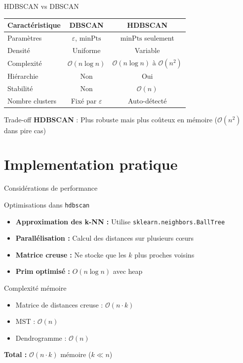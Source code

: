\documentclass[aspectratio=139,8pt]{beamer}
\newcommand{\minPts}{\mathrm{minPts}}
\begin{document}
\begin{frame}{HDBSCAN vs DBSCAN}
\begin{center}
\begin{tabular}{|l|c|c|}
\hline
\textbf{Caractéristique} & \textbf{DBSCAN} & \textbf{HDBSCAN} \\
\hline
Paramètres & $\varepsilon$, $\minPts$ & $\minPts$ seulement \\
\hline
Densité & Uniforme & Variable \\
\hline
Complexité & $\mathcal{O}(n \log n)$ & $\mathcal{O}(n \log n)$ à $\mathcal{O}(n^2)$ \\
\hline
Hiérarchie & Non & Oui \\
\hline
Stabilité & Non & $\mathcal{O}(n)$ \\
\hline
Nombre clusters & Fixé par $\varepsilon$ & Auto-détecté \\
\hline
\end{tabular}
\end{center}

\begin{block}{Trade-off}
\textbf{HDBSCAN} : Plus robuste mais plus coûteux en mémoire ($\mathcal{O}(n^2)$ dans pire cas)
\end{block}
\end{frame}

\section{Implementation pratique}

\begin{frame}{Considérations de performance}
\begin{block}{Optimisations dans \texttt{hdbscan}}
\begin{itemize}
\item \textbf{Approximation des k-NN :} Utilise \texttt{sklearn.neighbors.BallTree}
\item \textbf{Parallélisation :} Calcul des distances sur plusieurs cœurs
\item \textbf{Matrice creuse :} Ne stocke que les $k$ plus proches voisins
\item \textbf{Prim optimisé :} $O(n \log n)$ avec heap
\end{itemize}
\end{block}

\begin{alertblock}{Complexité mémoire}
\begin{itemize}
\item Matrice de distances creuse : $\mathcal{O}(n \cdot k)$
\item MST : $\mathcal{O}(n)$
\item Dendrogramme : $\mathcal{O}(n)$
\end{itemize}
\textbf{Total :} $\mathcal{O}(n \cdot k)$ mémoire ($k \ll n$)
\end{alertblock}
\end{frame}
\end{document}
